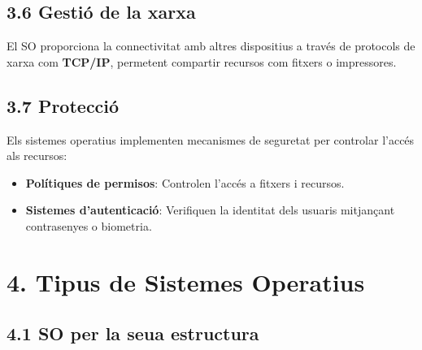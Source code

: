 \documentclass[
  a4paper,
]{article}
\begin{document}
\subsection{3.6 Gestió de la xarxa}\label{gestiuxf3-de-la-xarxa}

El SO proporciona la connectivitat amb altres dispositius a través de
protocols de xarxa com \textbf{TCP/IP}, permetent compartir recursos com
fitxers o impressores.

\subsection{3.7 Protecció}\label{protecciuxf3}

Els sistemes operatius implementen mecanismes de seguretat per controlar
l'accés als recursos:

\begin{itemize}
\item
  \textbf{Polítiques de permisos}: Controlen l'accés a fitxers i
  recursos.
\item
  \textbf{Sistemes d'autenticació}: Verifiquen la identitat dels usuaris
  mitjançant contrasenyes o biometria.
\end{itemize}

\section{4. Tipus de Sistemes
Operatius}\label{tipus-de-sistemes-operatius}

\subsection{4.1 SO per la seua
estructura}\label{so-per-la-seua-estructura}
\end{document}
